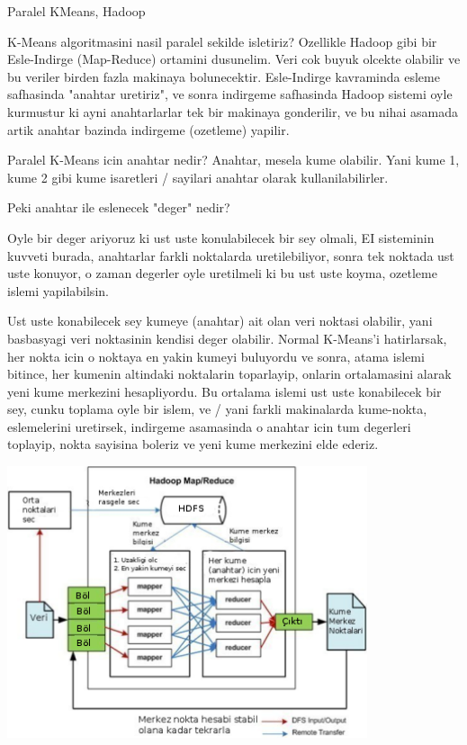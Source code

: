 \documentclass[12pt,fleqn]{article}\usepackage{../common}
\begin{document}
Paralel KMeans, Hadoop

K-Means algoritmasini nasil paralel sekilde isletiriz? Ozellikle Hadoop gibi bir Esle-Indirge (Map-Reduce) ortamini dusunelim. Veri cok buyuk olcekte olabilir ve bu veriler birden fazla makinaya bolunecektir. Esle-Indirge kavraminda esleme safhasinda "anahtar uretiriz", ve sonra indirgeme safhasinda Hadoop sistemi oyle kurmustur
ki ayni anahtarlarlar tek bir makinaya gonderilir, ve bu nihai asamada artik anahtar bazinda indirgeme (ozetleme) yapilir.

Paralel K-Means icin anahtar nedir? Anahtar, mesela kume olabilir. Yani kume 1, kume 2 gibi kume
isaretleri / sayilari anahtar olarak kullanilabilirler.

Peki anahtar ile eslenecek "deger" nedir?

Oyle bir deger ariyoruz ki ust uste konulabilecek bir sey olmali, EI sisteminin kuvveti burada, anahtarlar farkli noktalarda
uretilebiliyor, sonra tek noktada ust uste konuyor, o zaman degerler oyle uretilmeli ki bu ust uste koyma, ozetleme islemi yapilabilsin.

Ust uste konabilecek sey kumeye (anahtar) ait olan veri noktasi olabilir, yani basbasyagi veri noktasinin kendisi deger olabilir.  Normal K-Means'i hatirlarsak, her nokta icin o noktaya en yakin kumeyi buluyordu ve sonra, atama islemi bitince, her kumenin altindaki noktalarin toparlayip, onlarin ortalamasini alarak yeni kume merkezini hesapliyordu. Bu ortalama islemi ust uste konabilecek bir sey, cunku toplama oyle bir islem, ve / yani farkli makinalarda kume-nokta, eslemelerini uretirsek, indirgeme asamasinda o anahtar icin tum degerleri toplayip, nokta sayisina boleriz ve yeni kume merkezini elde ederiz. 

\includegraphics[height=8cm]{kmeans-diag.png}
\end{document}
